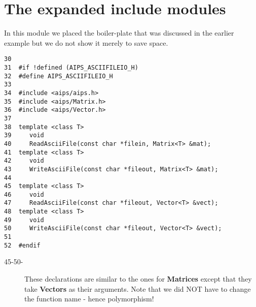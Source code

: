 \newpage
\section{The expanded {\bf include} modules}

	In this module we placed the boiler-plate that was discussed in the 
earlier example but we do not show it merely to save space.

\begin{verbatim}
30  
31  #if !defined (AIPS_ASCIIFILEIO_H)
32  #define AIPS_ASCIIFILEIO_H
33  
34  #include <aips/aips.h>
35  #include <aips/Matrix.h>
36  #include <aips/Vector.h>
37  
38  template <class T>
39     void
40     ReadAsciiFile(const char *filein, Matrix<T> &mat);
41  template <class T>
42     void
43     WriteAsciiFile(const char *fileout, Matrix<T> &mat);
44  
45  template <class T>
46     void
47     ReadAsciiFile(const char *fileout, Vector<T> &vect);
48  template <class T>
49     void
50     WriteAsciiFile(const char *fileout, Vector<T> &vect);
51  
52  #endif
\end{verbatim}

\begin{description}
\item[45-50-] These declarations are similar to the ones for {\bf Matrices} except that
they take {\bf Vectors} as their arguments.  Note that we did NOT have to change
the function name - hence polymorphism!
\end{description}

